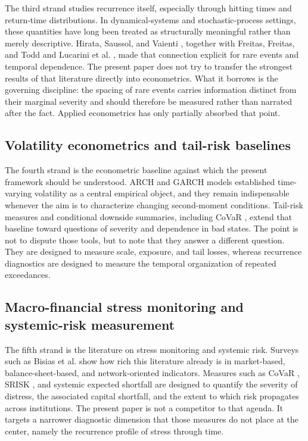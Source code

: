 \documentclass[11pt]{article}
\begin{document}
The third strand studies recurrence itself, especially through hitting times and return-time distributions. In dynamical-systems and stochastic-process settings, these quantities have long been treated as structurally meaningful rather than merely descriptive. Hirata, Saussol, and Vaienti \cite{hirata1999}, together with Freitas, Freitas, and Todd \cite{freitas2010} and Lucarini et al. \cite{lucarini2016}, made that connection explicit for rare events and temporal dependence. The present paper does not try to transfer the strongest results of that literature directly into econometrics. What it borrows is the governing discipline: the spacing of rare events carries information distinct from their marginal severity and should therefore be measured rather than narrated after the fact. Applied econometrics has only partially absorbed that point.

\subsection{Volatility econometrics and tail-risk baselines}

The fourth strand is the econometric baseline against which the present framework should be understood. ARCH and GARCH models \cite{engle1982,bollerslev1986} established time-varying volatility as a central empirical object, and they remain indispensable whenever the aim is to characterize changing second-moment conditions. Tail-risk measures and conditional downside summaries, including CoVaR \cite{adrian2016}, extend that baseline toward questions of severity and dependence in bad states. The point is not to dispute those tools, but to note that they answer a different question. They are designed to measure scale, exposure, and tail losses, whereas recurrence diagnostics are designed to measure the temporal organization of repeated exceedances.

\subsection{Macro-financial stress monitoring and systemic-risk measurement}

The fifth strand is the literature on stress monitoring and systemic risk. Surveys such as Bisias et al. \cite{bisias2012} show how rich this literature already is in market-based, balance-sheet-based, and network-oriented indicators. Measures such as CoVaR \cite{adrian2016}, SRISK \cite{brownlees2017}, and systemic expected shortfall \cite{acharya2017} are designed to quantify the severity of distress, the associated capital shortfall, and the extent to which risk propagates across institutions. The present paper is not a competitor to that agenda. It targets a narrower diagnostic dimension that those measures do not place at the center, namely the recurrence profile of stress through time.
\end{document}
